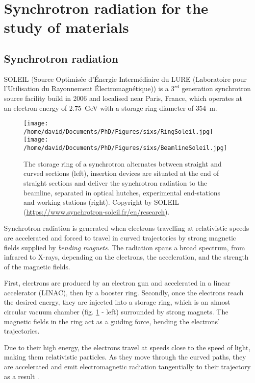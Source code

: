 \section{Synchrotron radiation for the study of materials} \label{sec:SIXS}

\subsection{Synchrotron radiation}

SOLEIL (Source Optimisée d’Énergie Intermédiaire du LURE (Laboratoire pour l’Utilisation du Rayonnement Électromagnétique)) is a $3^{rd}$ generation synchrotron source facility build in 2006 and localised near Paris, France, which operates at an electron energy of \qty{2.75}{\GeV} with a storage ring diameter of \qty{354}{\m}.

\begin{figure}[!htb]
    \centering
    \texttt{[image: /home/david/Documents/PhD/Figures/sixs/RingSoleil.jpg]}
    \texttt{[image: /home/david/Documents/PhD/Figures/sixs/BeamlineSoleil.jpg]}
    \caption{
    	The storage ring of a synchrotron alternates between straight and curved sections (left), insertion devices are situated at the end of straight sections and deliver the synchrotron radiation to the beamline, separated in optical hutches, experimental end-stations and working stations (right).
    	Copyright by SOLEIL (\url{https://www.synchrotron-soleil.fr/en/research}).
    }
    \label{fig:SOLEIL}
\end{figure}

Synchrotron radiation is generated when electrons travelling at relativistic speeds are accelerated and forced to travel in curved trajectories by strong magnetic fields supplied by \textit{bending magnets}.
The radiation spans a broad spectrum, from infrared to X-rays, depending on the electrons, the acceleration, and the strength of the magnetic fields.

First, electrons are produced by an electron gun and accelerated in a linear accelerator (LINAC), then by a booster ring.
Secondly, once the electrons reach the desired energy, they are injected into a storage ring, which is an almost circular vacuum chamber (fig. \ref{fig:SOLEIL} - left) surrounded by strong magnets.
The magnetic fields in the ring act as a guiding force, bending the electrons' trajectories.

Due to their high energy, the electrons travel at speeds close to the speed of light, making them relativistic particles.
As they move through the curved paths, they are accelerated and emit electromagnetic radiation tangentially to their trajectory as a result \parencite{Willmott, NielsenMcMorrow}.


